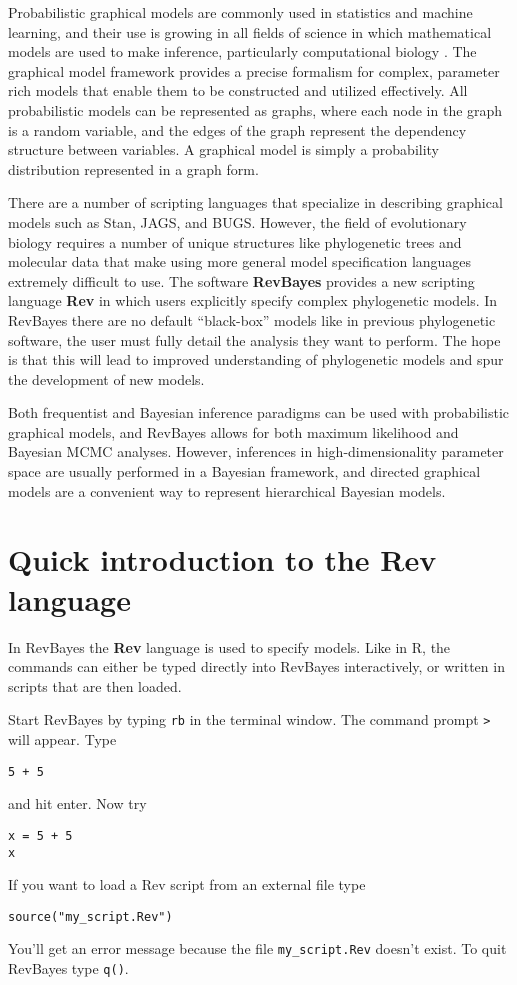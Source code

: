 \documentclass[11pt]{article}
\begin{document}
Probabilistic graphical models are commonly used in statistics and machine learning,
and their use is growing in all fields of science in which mathematical models
are used to make inference, particularly computational biology \citep{jordan2004graphical, airoldi2007getting}.
The graphical model framework provides a precise formalism
for complex, parameter rich models that enable them
to be constructed and utilized effectively. 
All probabilistic models can be represented as graphs,
where each node in the graph is a random variable, and the edges of the graph represent
the dependency structure between variables.
A graphical model is simply a probability distribution represented in a graph form.

There are a number of scripting languages that specialize in
describing graphical models such as Stan, JAGS, and BUGS.
However, the field of evolutionary biology requires a number of unique structures
like phylogenetic trees and molecular data that make using 
more general model specification languages extremely difficult to use.
The software \textbf{RevBayes} \citep{hohna2014probabilistic} provides a new scripting language \textbf{Rev}
in which users explicitly specify complex phylogenetic models.
In RevBayes there are no default ``black-box'' models like in previous
phylogenetic software, the user must fully detail the analysis they want to perform.
The hope is that this will lead to improved understanding of phylogenetic
models and spur the development of new models. 

Both frequentist and Bayesian inference paradigms
can be used with probabilistic graphical models,
and RevBayes allows for both maximum likelihood
and Bayesian MCMC analyses.
However, inferences in high-dimensionality
parameter space are usually performed in a Bayesian framework,
and directed graphical models are a convenient way
to represent hierarchical Bayesian models.

\section{Quick introduction to the Rev language}

In RevBayes the \textbf{Rev} language is used to specify
models.
Like in R, the commands can either be typed directly into
RevBayes interactively,
or written in scripts that are then loaded.

Start RevBayes by typing \texttt{rb} in the terminal window.
The command prompt \texttt{>} will appear. Type
\begin{verbatim}
5 + 5
\end{verbatim}
and hit enter. Now try
\begin{verbatim}
x = 5 + 5
x
\end{verbatim}
If you want to load a Rev script from an external file type
\begin{verbatim}
source("my_script.Rev")
\end{verbatim}
You'll get an error message because the file \texttt{my\_script.Rev}
doesn't exist.
To quit RevBayes type \texttt{q()}.
\end{document}
